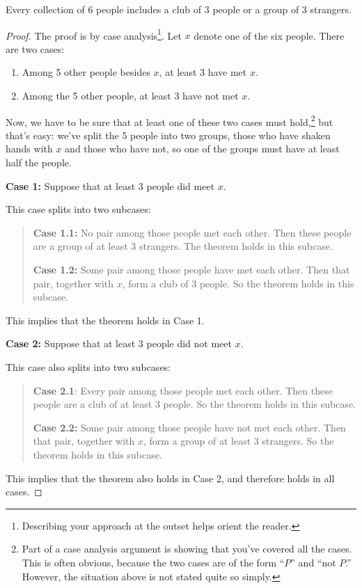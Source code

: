 \begin{theorem*}
Every collection of 6 people includes a club of 3 people or a group of 3
strangers.
\end{theorem*}

\begin{proof}
The proof is by case analysis\footnote{Describing your approach at the
outset helps orient the reader.}.  Let $x$ denote one of the six
people.  There are two cases:

\begin{enumerate}
\item\label{3met} Among 5 other people besides $x$, at least 3 have met
  $x$.

\item \label{3notmet} Among the 5 other people, at least 3 have not met
  $x$.
\end{enumerate}

Now, we have to be sure that at least one of these two cases must
hold,\footnote{Part of a case analysis argument is showing that you've
  covered all the cases.  This is often obvious, because the two cases are
  of the form ``$P$'' and ``not $P$.''  However, the situation above is
  not stated quite so simply.} but that's easy: we've split the 5 people
into two groups, those who have shaken hands with $x$ and those who have
not, so one of the groups must have at least half the people.

\textbf{Case 1:}  Suppose that at least 3 people did meet $x$.

This case splits into two subcases:
\begin{quote}

\textbf{Case 1.1:} No pair among those people met each other.  Then these
people are a group of at least 3 strangers.  The theorem holds in this
subcase.

\textbf{Case 1.2:} Some pair among those people have met each other.
Then that pair, together with $x$, form a club of 3 people.  So the
theorem holds in this subcase.

\end{quote}
This implies that the theorem holds in Case 1.

\textbf{Case 2:} Suppose that at least 3 people did not meet $x$.

This case also splits into two subcases:
\begin{quote}

\textbf{Case 2.1}: Every pair among those people met each other.  Then these
people are a club of at least 3 people.   So the theorem holds in this subcase.

\textbf{Case 2.2:} Some pair among those people have not met each other.
Then that pair, together with $x$, form a group of at least 3 strangers.
So the theorem holds in this subcase.

\end{quote}
This implies that the theorem also holds in Case 2, and therefore holds in
all cases.
\end{proof}

